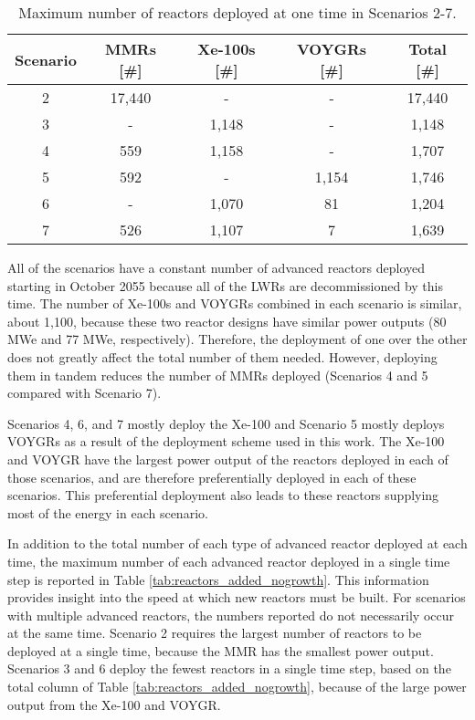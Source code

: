 \begin{table}
    \centering 
    \caption{Maximum number of reactors deployed at one time in 
    Scenarios 2-7.}
    \label{tab:reactors_nogrowth}
    \begin{tabular}{c c c c c}
        \hline
        Scenario & \glspl{MMR} [\#] & Xe-100s [\#] & VOYGRs [\#] 
        & Total [\#]\\\hline
        2 & 17,440 & - & - & 17,440\\
        3 & - & 1,148 & - & 1,148\\
        4 & 559 & 1,158 & - & 1,707\\
        5 & 592 & - & 1,154 & 1,746\\
        6 & - & 1,070 & 81 & 1,204\\
        7 & 526 & 1,107 & 7 & 1,639\\
        \hline
    \end{tabular}
\end{table}

All of the scenarios have a constant number of advanced reactors 
deployed starting in October 2055 because all of the \glspl{LWR} are 
decommissioned by this time. The number of Xe-100s and VOYGRs combined 
in each scenario is similar, about 1,100, because these two reactor 
designs have similar power outputs (80 MWe and 77 MWe, respectively). 
Therefore, the deployment of one over the other does 
not greatly affect the total number of them needed. However, 
deploying them in tandem reduces the number of \glspl{MMR} deployed
(Scenarios 4 and 5 compared with Scenario 7). 

Scenarios 4, 6, and 7 mostly deploy the Xe-100 and Scenario 5 mostly deploys 
VOYGRs as a result of the deployment scheme used in this work. The Xe-100 and 
VOYGR have the largest power output of the reactors deployed in each of those 
scenarios, and are therefore preferentially deployed in each of these scenarios.
This preferential deployment also leads to these reactors supplying most of 
the energy in each scenario.  

In addition to the total number of each type of advanced reactor deployed 
at each time, the maximum number of each advanced reactor deployed in a 
single time step is reported in Table 
\ref{tab:reactors_added_nogrowth}. This information provides insight 
into the speed at which new reactors must be built. For scenarios with 
multiple advanced reactors, the numbers reported do not necessarily occur 
at the same time. Scenario 2 requires 
the largest number of reactors to be deployed at a single time, because 
the \gls{MMR} has the smallest power output. Scenarios 3 and 
6 deploy the fewest reactors in 
a single time step, based on the total column of Table 
\ref{tab:reactors_added_nogrowth}, because of the large power output from 
the Xe-100 and VOYGR. 

